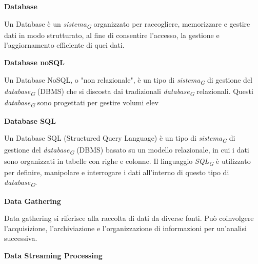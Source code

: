 \documentclass{article}
\begin{document}
\vspace{0.4cm}

\textbf{Database}

\vspace{0.1cm}

Un Database è un \textit{sistema}\textsubscript{\textit{G}} organizzato per raccogliere, memorizzare e gestire dati in modo strutturato, al fine di consentire l'accesso, la gestione e l'aggiornamento efficiente di quei dati.

\vspace{0.4cm}

\textbf{Database noSQL}

\vspace{0.1cm}

Un Database NoSQL, o "non relazionale", è un tipo di \textit{sistema}\textsubscript{\textit{G}} di gestione del \textit{database}\textsubscript{\textit{G}} (DBMS) che si discosta dai tradizionali \textit{database}\textsubscript{\textit{G}} relazionali. Questi \textit{database}\textsubscript{\textit{G}} sono progettati per gestire volumi elev

\vspace{0.4cm}

\textbf{Database SQL}

\vspace{0.1cm}

Un Database SQL (Structured Query Language) è un tipo di \textit{sistema}\textsubscript{\textit{G}} di gestione del \textit{database}\textsubscript{\textit{G}} (DBMS) basato su un modello relazionale, in cui i dati sono organizzati in tabelle con righe e colonne. Il linguaggio \textit{SQL}\textsubscript{\textit{G}} è utilizzato per definire, manipolare e interrogare i dati all'interno di questo tipo di \textit{database}\textsubscript{\textit{G}}.

\vspace{0.4cm}

\textbf{Data Gathering}

\vspace{0.1cm}

Data gathering si riferisce alla raccolta di dati da diverse fonti. Può coinvolgere l'acquisizione, l'archiviazione e l'organizzazione di informazioni per un'analisi successiva.

\vspace{0.4cm}

\textbf{Data Streaming Processing}

\vspace{0.1cm}
\end{document}
